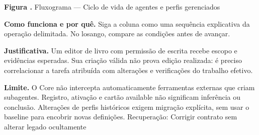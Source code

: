 {\small\textbf{Figura \thefigure.} Fluxograma --- Ciclo de vida de agentes e perfis gerenciados}\par\smallskip
\noindent\textbf{Como funciona e por quê.} Siga a coluna como uma sequência explicativa da operação delimitada. No losango, compare as condições antes de avançar.\par
\noindent\textbf{Justificativa.} Um editor de livro com permissão de escrita recebe escopo e evidências esperadas. Sua criação válida não prova edição realizada: é preciso correlacionar a tarefa atribuída com alterações e verificações do trabalho efetivo.\par
\noindent\textbf{Limite.} O Core não intercepta automaticamente ferramentas externas que criam subagentes. Registro, ativação e cartão available não significam inferência ou conclusão. Alterações de perfis históricos exigem migração explícita, sem usar o baseline para encobrir novas definições. Recuperação: Corrigir contrato sem alterar legado ocultamente\par\smallskip
{}
